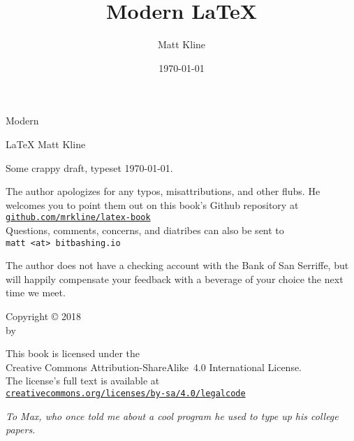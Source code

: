 \documentclass[fontsize=11pt, numbers=endperiod, draft=off]{scrbook}
\title{Modern LaTeX}
\author{Matt Kline}
\date{\today}
\makeatletter
\newcommand{\https}[1]{\href{https://#1}{\texttt{#1}}}
\let\runauthor\@author
\makeatother
\begin{document}
\fontsize{11pt}{13pt}\selectfont

\frontmatter
\setcounter{secnumdepth}{0}
\setlength\parindent{0pt}

{}
\vspace*{1.5in}
\begin{center}
\fontsize{0.5in}{0.7in}\selectfont
Modern

\fontsize{1in}{1.1in}\selectfont
\LaTeX
\vfill
\LARGE
Matt Kline
\end{center}
\clearpage

\null
\vfill
Some crappy draft, typeset \today.
\vspace*{0.5in}

The author apologizes for any typos, misattributions, and other flubs.
He welcomes you to point them out on this book's Github
repository at \\
\https{github.com/mrkline/latex-book} \\
Questions, comments, concerns, and diatribes can also be sent to \\
\texttt{matt <at> bitbashing.io}

The author does not have a checking account with the Bank of San Serriffe,
but will happily compensate your feedback with a beverage of your choice the
next time we meet.

\vspace*{0.5in}
{
Copyright © 2018 \\
by \runauthor
\bigskip

This book is licensed under the \\
Creative Commons Attribution-ShareAlike~4.0 International License. \\
The license's full text is available at \\
\https{creativecommons.org/licenses/by-sa/4.0/legalcode}
}
\clearpage

\vspace*{1in}
{\itshape%
%
To Max, who once told me about a cool program he used to type up
his college papers.
}
\cleardoublepage

\tableofcontents

\mainmatter
\setlength\parindent{1em}
\end{document}

